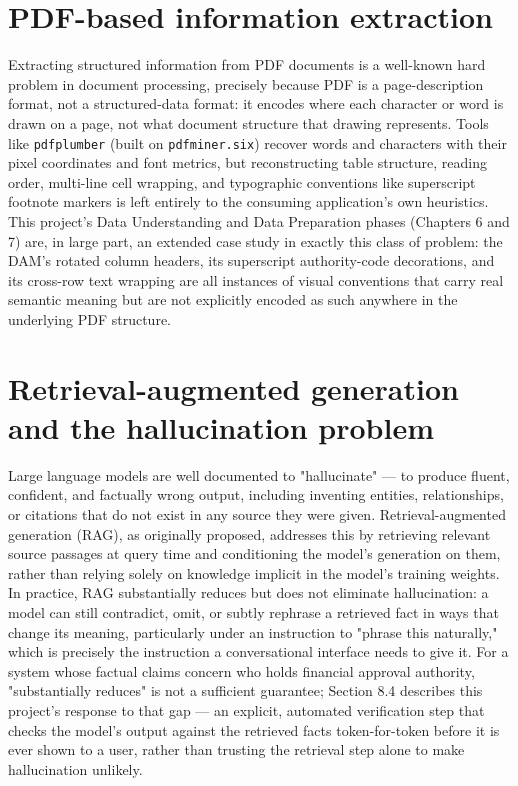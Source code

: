 \section{PDF-based information extraction}
Extracting structured information from PDF documents is a well-known hard problem in document processing, precisely because PDF is a page-description format, not a structured-data format: it encodes where each character or word is drawn on a page, not what document structure that drawing represents. Tools like \texttt{pdfplumber} (built on \texttt{pdfminer.six}) recover words and characters with their pixel coordinates and font metrics, but reconstructing table structure, reading order, multi-line cell wrapping, and typographic conventions like superscript footnote markers is left entirely to the consuming application's own heuristics. This project's Data Understanding and Data Preparation phases (Chapters 6 and 7) are, in large part, an extended case study in exactly this class of problem: the DAM's rotated column headers, its superscript authority-code decorations, and its cross-row text wrapping are all instances of visual conventions that carry real semantic meaning but are not explicitly encoded as such anywhere in the underlying PDF structure.

\section{Retrieval-augmented generation and the hallucination problem}
Large language models are well documented to "hallucinate" — to produce fluent, confident, and factually wrong output, including inventing entities, relationships, or citations that do not exist in any source they were given. Retrieval-augmented generation (RAG), as originally proposed, addresses this by retrieving relevant source passages at query time and conditioning the model's generation on them, rather than relying solely on knowledge implicit in the model's training weights. In practice, RAG substantially reduces but does not eliminate hallucination: a model can still contradict, omit, or subtly rephrase a retrieved fact in ways that change its meaning, particularly under an instruction to "phrase this naturally," which is precisely the instruction a conversational interface needs to give it. For a system whose factual claims concern who holds financial approval authority, "substantially reduces" is not a sufficient guarantee; Section 8.4 describes this project's response to that gap — an explicit, automated verification step that checks the model's output against the retrieved facts token-for-token before it is ever shown to a user, rather than trusting the retrieval step alone to make hallucination unlikely.

